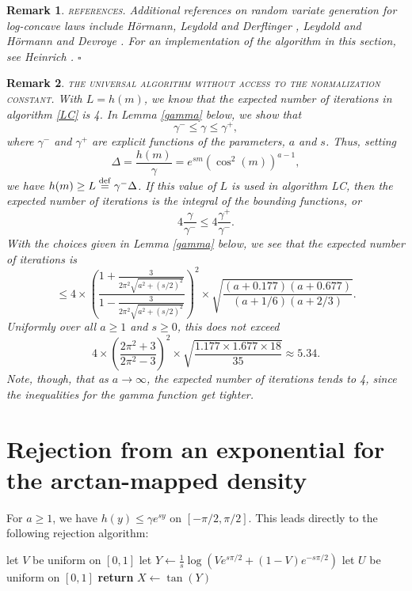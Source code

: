 \documentclass[12pt,reqno,tbtags]{amsart}
\newcommand{\inlaw}{\buildrel {\mathcal L} \over =}
\newcommand{\isdef}{\buildrel {\rm def} \over =}
\newtheorem{remark}{Remark}
\begin{document}
\begin{remark}
    \textsc{references.}  Additional references on random variate generation for 
log-concave laws include H\"ormann, Leydold and Derflinger \cite{HLD}, Leydold and H\"ormann \cite{LH, LH2}
and Devroye \cite{D5}.  For an implementation of the algo\-rithm in this section, see Heinrich \cite{Hei}. $\square$
\end{remark}


\begin{remark}
\textsc{the universal algorithm without access to the norma\-li\-zation constant.}
With $L= h(m)$, we know that the expected number of iterations in algorithm \ref{LC}
is 4. In Lemma \ref{gamma} below, we show 
that 
$$
\gamma^- \le \gamma \le \gamma^+,
$$
where $\gamma^-$ and $\gamma^+$ are explicit functions of the parameters, $a$ and $s$.
Thus, setting
$$
\Delta = \frac{h(m)}{\gamma}
=   e^{sm} ( \cos^2 (m))^{a-1},
$$
we have $h(m) \ge L \isdef \gamma^- \Delta$. If this value of $L$ is used in algorithm {LC}, then
the expected number of iterations
is the  integral of the bounding functions, or
$$
4  \frac{\gamma }{ \gamma^-} \le
4  \frac{ \gamma^+ }{ \gamma^-} .
$$
With the choices given in Lemma \ref{gamma} below, we see that the expected number of iterations is
$$
\le 4 \times \left( 
\frac
{ 1 + \frac{3 }{ 2 \pi^2 \sqrt{a^2 + (s/2)^2}} }
{ 1 - \frac{3 }{ 2 \pi^2 \sqrt{a^2 + (s/2)^2} } } 
\right)^2
\times \sqrt{\frac{ (a+ 0.177)(a+0.677)  }{ (a+ 1/6)(a+2/3) }}.
$$
Uniformly over all $a \ge 1$ and $s \ge 0$, this does not exceed
$$
4 \times \left( \frac{ 2\pi^2 +3  }{ 2 \pi^2 - 3 } \right)^2 \times \sqrt{\frac{ 1.177 \times 1.677 \times 18  }{ 35 }}
\approx 5.34.
$$
Note, though, that as $a \to \infty$, the expected number of iterations tends to 4, since the
inequalities for the gamma function get tighter.
\end{remark}

\section{Rejection from an exponential for the arctan-mapped density}\label{gaussian}

For $a \ge 1$, we have $h(y) \le \gamma e^{sy}$  on $[-\pi/2,\pi/2]$. This leads directly to the following rejection algorithm:


\begin{algorithm}[H]
\caption{PearsonIV generator by rejection from the exponential density when $a \ge 1$.}\label{expo-rejection}
\begin{algorithmic}[1]
\Repeat 
\State let $V$ be uniform on $[0,1]$
\State let $Y \leftarrow \frac{1}{s} \log \left( V e^{s\pi/2}  + (1-V) e^{-s\pi/2} \right)$
\State let $U$ be uniform on $[0,1]$
\State \textbf {return} $X \leftarrow \tan(Y)$  
\Comment{$X \inlaw P_{a,s}$ }
\end{algorithmic}
\end{algorithm}
\end{document}
